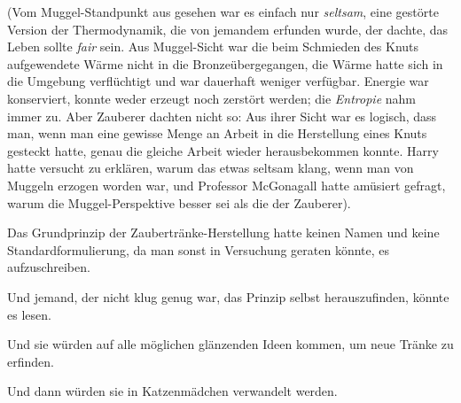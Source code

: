 (Vom Muggel-Standpunkt aus gesehen war es einfach nur \emph{seltsam}, eine gestörte Version der Thermodynamik, die von jemandem erfunden wurde, der dachte, das Leben sollte \emph{fair} sein. Aus Muggel-Sicht war die beim Schmieden des Knuts aufgewendete Wärme nicht in die Bronzeübergegangen, die Wärme hatte sich in die Umgebung verflüchtigt und war dauerhaft weniger verfügbar. Energie war konserviert, konnte weder erzeugt noch zerstört werden; die \emph{Entropie} nahm immer zu. Aber Zauberer dachten nicht so: Aus ihrer Sicht war es logisch, dass man, wenn man eine gewisse Menge an Arbeit in die Herstellung eines Knuts gesteckt hatte, genau die gleiche Arbeit wieder herausbekommen konnte. Harry hatte versucht zu erklären, warum das etwas seltsam klang, wenn man von Muggeln erzogen worden war, und Professor McGonagall hatte amüsiert gefragt, warum die Muggel-Perspektive besser sei als die der Zauberer).

Das Grundprinzip der Zaubertränke-Herstellung hatte keinen Namen und keine Standardformulierung, da man sonst in Versuchung geraten könnte, es aufzuschreiben.

Und jemand, der nicht klug genug war, das Prinzip selbst herauszufinden, könnte es lesen.

Und sie würden auf alle möglichen glänzenden Ideen kommen, um neue Tränke zu erfinden.

Und dann würden sie in Katzenmädchen verwandelt werden.

